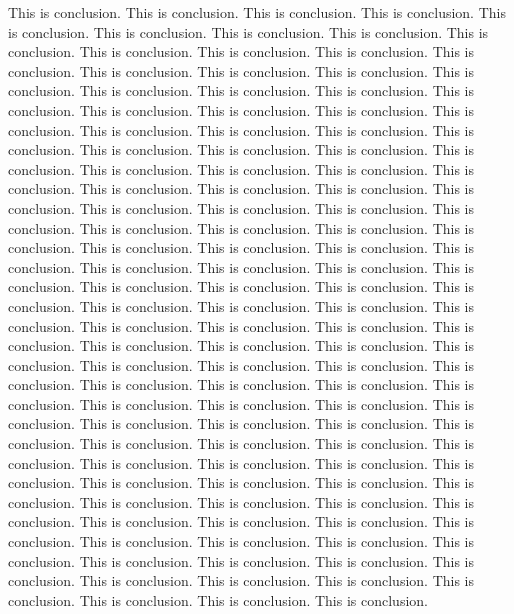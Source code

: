 \documentclass[hyperref]{ctexart}
\begin{document}
\begin{multicols}{2}
	This is conclusion.
	This is conclusion.
	This is conclusion.
	This is conclusion.
	This is conclusion.
	This is conclusion.
	This is conclusion.
	This is conclusion.
	This is conclusion.
	This is conclusion.
	This is conclusion.
	This is conclusion.
	This is conclusion.
	This is conclusion.
	This is conclusion.
	This is conclusion.
	This is conclusion.
	This is conclusion.
	This is conclusion.
	This is conclusion.
	This is conclusion.
	This is conclusion.
	This is conclusion.
	This is conclusion.
	This is conclusion.
	This is conclusion.
	This is conclusion.
	This is conclusion.
	This is conclusion.
	This is conclusion.
	This is conclusion.
	This is conclusion.
	This is conclusion.
	This is conclusion.
	This is conclusion.
	This is conclusion.
	This is conclusion.
	This is conclusion.
	This is conclusion.
	This is conclusion.
	This is conclusion.
	This is conclusion.
	This is conclusion.
	This is conclusion.
	This is conclusion.
	This is conclusion.
	This is conclusion.
	This is conclusion.
	This is conclusion.
	This is conclusion.
	This is conclusion.
	This is conclusion.
	This is conclusion.
	This is conclusion.
	This is conclusion.
	This is conclusion.
	This is conclusion.
	This is conclusion.
	This is conclusion.
	This is conclusion.
	This is conclusion.
	This is conclusion.
	This is conclusion.
	This is conclusion.
	This is conclusion.
	This is conclusion.
	This is conclusion.
	This is conclusion.
	This is conclusion.
	This is conclusion.
	This is conclusion.
	This is conclusion.
	This is conclusion.
	This is conclusion.
	This is conclusion.
	This is conclusion.
	This is conclusion.
	This is conclusion.
	This is conclusion.
	This is conclusion.
	This is conclusion.
	This is conclusion.
	This is conclusion.
	This is conclusion.
	This is conclusion.
	This is conclusion.
	This is conclusion.
	This is conclusion.
	This is conclusion.
	This is conclusion.
	This is conclusion.
	This is conclusion.
	This is conclusion.
	This is conclusion.
	This is conclusion.
	This is conclusion.
	This is conclusion.
	This is conclusion.
	This is conclusion.
	This is conclusion.
	This is conclusion.
	This is conclusion.
	This is conclusion.
	This is conclusion.
	This is conclusion.
	This is conclusion.
	This is conclusion.
	This is conclusion.
	This is conclusion.
	This is conclusion.
	This is conclusion.
	This is conclusion.
	This is conclusion.
	This is conclusion.
	This is conclusion.
	This is conclusion.
	This is conclusion.
	This is conclusion.
	This is conclusion.
	This is conclusion.
	This is conclusion.
	This is conclusion.
	This is conclusion.
	This is conclusion.

\end{multicols}
\end{document}
